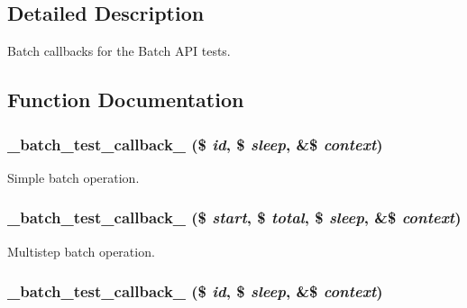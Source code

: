 \subsection{Detailed Description}
Batch callbacks for the Batch API tests. 

\subsection{Function Documentation}
\hypertarget{batch__test_8callbacks_8inc_a06d8112c2b65db5cdb252f9f998593fd}{
\subsubsection[{\_\-batch\_\-test\_\-callback\_\-1}]{\setlength{\rightskip}{0pt plus 5cm}\_\-batch\_\-test\_\-callback\_ (\$ {\em id}, \/  \$ {\em sleep}, \/  \&\$ {\em context})}}
\label{batch__test_8callbacks_8inc_a06d8112c2b65db5cdb252f9f998593fd}
Simple batch operation. \hypertarget{batch__test_8callbacks_8inc_a4115acbe5e2f47b8e730491b50e02bfa}{
\subsubsection[{\_\-batch\_\-test\_\-callback\_\-2}]{\setlength{\rightskip}{0pt plus 5cm}\_\-batch\_\-test\_\-callback\_ (\$ {\em start}, \/  \$ {\em total}, \/  \$ {\em sleep}, \/  \&\$ {\em context})}}
\label{batch__test_8callbacks_8inc_a4115acbe5e2f47b8e730491b50e02bfa}
Multistep batch operation. \hypertarget{batch__test_8callbacks_8inc_ac396fb40be0f490431f4bcd459135218}{
\subsubsection[{\_\-batch\_\-test\_\-callback\_\-5}]{\setlength{\rightskip}{0pt plus 5cm}\_\-batch\_\-test\_\-callback\_ (\$ {\em id}, \/  \$ {\em sleep}, \/  \&\$ {\em context})}}
